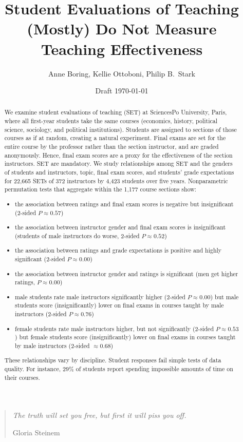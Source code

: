 \documentclass[12pt]{article}
\title{Student Evaluations of Teaching (Mostly) Do Not Measure Teaching Effectiveness}
\author{Anne Boring, Kellie Ottoboni, Philip B.~Stark}
\date{Draft \today}
\begin{document}
\maketitle

\newpage
\begin{quotation}
    \emph{The truth will set you free, but first it will piss you off.}
    
     \hfill Gloria Steinem

\begin{abstract}
We examine student evaluations of teaching (SET) at SciencesPo
University, Paris, where all
first-year students take the same courses 
(economics, history, political science, sociology, and political institutions). 
Students are assigned to sections of those courses as if at random, creating a natural experiment.
Final exams are set for the entire course
by the professor rather than the section instructor, and are graded anonymously.
Hence, final exam scores are a proxy for the effectiveness of the section instructors.
SET are mandatory.
We study relationships among SET and the genders of students and
instructors, topic, final exam scores, and students' grade expectations
for 22,665 SETs of 372 instructors by 4,423 students over five years.
Nonparametric permutation tests that aggregate within the 1,177 course sections show: 
\begin{itemize}
   \item the association between ratings and final 
            exam scores is negative but insignificant
            (2-sided $P \approx 0.57$)
   \item the association between instructor gender 
            and final exam scores is insignificant
            (students of male instructors do worse, 2-sided $P \approx 0.52$)
   \item the association between ratings and grade 
            expectations is positive and highly significant
            (2-sided $P \approx 0.00$)
   \item the association between instructor 
            gender and ratings is significant 
            (men get higher ratings, $P \approx 0.00$)
   \item male students rate male instructors significantly higher (2-sided $P \approx 0.00$) 
            but male students score (insignificantly) lower on final exams in courses taught
            by male instructors (2-sided $P \approx 0.76$)
   \item female students rate male instructors higher, but not significantly (2-sided $P \approx 0.53$)
            but female students score (insignificantly) lower on final exams in courses taught
            by male instructors (2-sided $\approx 0.68$)
\end{itemize}
These relationships vary by discipline.
Student responses fail simple tests of data quality.
For instance, 29\% of students report spending impossible amounts of time
on their courses.

\end{abstract}

\newpage

\end{quotation}
\end{document}
